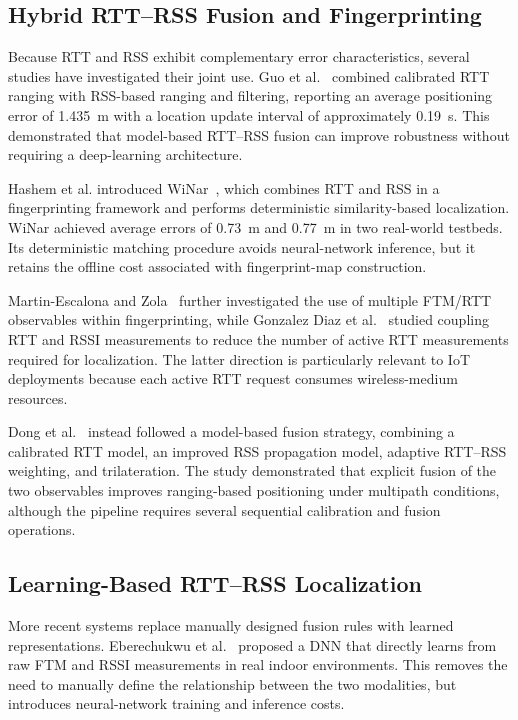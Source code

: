 \subsection{Hybrid RTT--RSS Fusion and Fingerprinting}
\label{subsec:rw_hybrid}

Because RTT and RSS exhibit complementary error characteristics, several studies have investigated their joint use. Guo et al.~\cite{guo2019hybrid} combined calibrated RTT ranging with RSS-based ranging and filtering, reporting an average positioning error of 1.435~m with a location update interval of approximately 0.19~s. This demonstrated that model-based RTT--RSS fusion can improve robustness without requiring a deep-learning architecture.

Hashem et al. introduced WiNar~\cite{hashem2021winar}, which combines RTT and RSS in a fingerprinting framework and performs deterministic similarity-based localization. WiNar achieved average errors of 0.73~m and 0.77~m in two real-world testbeds. Its deterministic matching procedure avoids neural-network inference, but it retains the offline cost associated with fingerprint-map construction.

Martin-Escalona and Zola~\cite{martinescalona2023ftm} further investigated the use of multiple FTM/RTT observables within fingerprinting, while Gonzalez Diaz et al.~\cite{gonzalezdiaz2023coupling} studied coupling RTT and RSSI measurements to reduce the number of active RTT measurements required for localization. The latter direction is particularly relevant to IoT deployments because each active RTT request consumes wireless-medium resources.

Dong et al.~\cite{dong2023rtt_rss} instead followed a model-based fusion strategy, combining a calibrated RTT model, an improved RSS propagation model, adaptive RTT--RSS weighting, and trilateration. The study demonstrated that explicit fusion of the two observables improves ranging-based positioning under multipath conditions, although the pipeline requires several sequential calibration and fusion operations.

\subsection{Learning-Based RTT--RSS Localization}
\label{subsec:rw_learning}

More recent systems replace manually designed fusion rules with learned representations. Eberechukwu et al.~\cite{eberechukwu2023fusion} proposed a DNN that directly learns from raw FTM and RSSI measurements in real indoor environments. This removes the need to manually define the relationship between the two modalities, but introduces neural-network training and inference costs.

